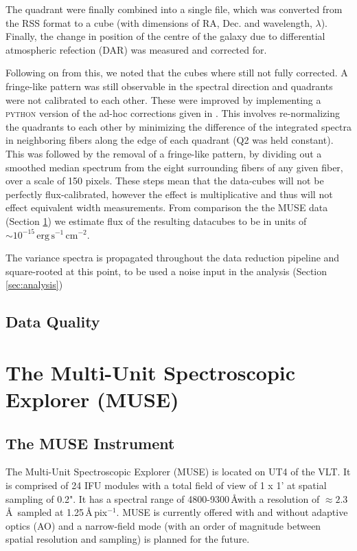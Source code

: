 		The quadrant were finally combined into a single file, which was converted from the RSS format to a cube (with dimensions of RA, Dec. and wavelength, $\lambda$). Finally, the change in position of the centre of the galaxy due to differential atmospheric refection (DAR) was measured and corrected for. 

		Following on from this, we noted that the cubes where still not fully corrected. A fringe-like pattern was still observable in the spectral direction and quadrants were not calibrated to each other. These were improved by implementing a \textsc{python} version of the ad-hoc corrections given in \citet{Lagerholm2012}. This involves re-normalizing the quadrants to each other by minimizing the difference of the integrated spectra in neighboring fibers along the edge of each quadrant (Q2 was held constant). This was followed by the removal of a fringe-like pattern, by dividing out a smoothed median spectrum from the eight surrounding fibers of any given fiber, over a scale of 150 pixels. These steps mean that the data-cubes will not be perfectly flux-calibrated, however the effect is multiplicative and thus will not effect equivalent width measurements. From comparison the the MUSE data (Section \ref{sec:MUSE}) we estimate flux of the resulting datacubes to be in units of $\sim 10^{-15} \, \mathrm{erg\,s^{-1}\,cm^{-2}}$. 

		The variance spectra is propagated throughout the data reduction pipeline and square-rooted at this point, to be used a noise input in the analysis (Section \ref{sec:analysis})

	\subsection{Data Quality}
		\label{subsec:VIMOSartifacts}













\section{The Multi-Unit Spectroscopic Explorer (MUSE)}
	\label{sec:MUSE}
	\subsection{The MUSE Instrument}
		The Multi-Unit Spectroscopic Explorer (MUSE) is located on UT4 of the VLT. It is comprised of 24 IFU modules with a total field of view of 1 x 1' at spatial sampling of 0.2". It has a spectral range of 4800-9300\,\AA with a resolution of $\approx 2.3$\,\AA\ sampled at 1.25\,\AA\,pix$^{-1}$. MUSE is currently offered with and without adaptive optics (AO) and a narrow-field mode (with an order of magnitude between spatial resolution and sampling) is planned for the future. 
		
